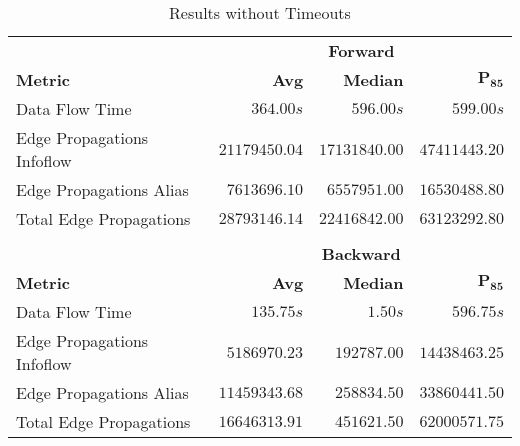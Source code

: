 \documentclass[../draft.tex]{subfiles}
\begin{document}
    \begin{table}[ht]
        \centering
        \begin{tabular}{l | r | r | r}
            & \multicolumn{3}{c}{\textbf{Forward}}\\
            \textbf{Metric} & \textbf{Avg} & \textbf{Median} & $\mathbf{P_{85}}$\\
            \hline\hline
            Data Flow Time & $364.00s$ & $596.00s$ & $599.00s$\\
            \hline
            Edge Propagations Infoflow & $21179450.04$ & $17131840.00$ & $47411443.20$\\
            Edge Propagations Alias & $7613696.10$ & $6557951.00$ & $16530488.80$\\
            Total Edge Propagations & $28793146.14$ & $22416842.00$ & $63123292.80$\\                  
            \multicolumn{4}{c}{}\\
            & \multicolumn{3}{c}{\textbf{Backward}}\\
            \textbf{Metric} & \textbf{Avg} & \textbf{Median} & $\mathbf{P_{85}}$\\
            \hline\hline
            Data Flow Time & $135.75s$ & $1.50s$ & $596.75s$\\
            \hline
            Edge Propagations Infoflow & $5186970.23$ & $192787.00$ & $14438463.25$\\
            Edge Propagations Alias & $11459343.68$ & $258834.50$ & $33860441.50$\\
            Total Edge Propagations & $16646313.91$ & $451621.50$ & $62000571.75$\\            
        \end{tabular}
        \caption{Results without Timeouts}
        \label{t:realworldresultswithouttimeout}
    \end{table}
\end{document}
